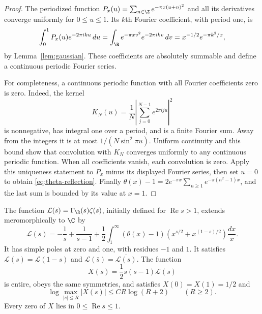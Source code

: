 \begin{proof}
The periodized function
$P_x(u)=\sum_{n\in\Z}e^{-\pi x(u+n)^2}$ and all its derivatives converge
uniformly for $0\leq u\leq1$.
Its $k$th Fourier coefficient, with period one, is
\[
 \int_0^1P_x(u)e^{-2\pi iku}\,du
 =\int_{\R}e^{-\pi xv^2}e^{-2\pi ikv}\,dv
 =x^{-1/2}e^{-\pi k^2/x},
\]
by Lemma~\ref{lem:gaussian}.
These coefficients are absolutely summable and define a continuous
periodic Fourier series.

For completeness, a continuous periodic function with all Fourier
coefficients zero is zero.  Indeed, the kernel
\[
 K_N(u)=\frac1N\left|\sum_{j=0}^{N-1}e^{2\pi iju}\right|^2
\]
is nonnegative, has integral one over a period, and is a finite Fourier sum.
Away from the integers it is at most $1/(N\sin^2\pi u)$.
Uniform continuity and this bound show that convolution with $K_N$ converges
uniformly to any continuous periodic function.
When all coefficients vanish, each convolution is zero.
Apply this uniqueness statement to $P_x$ minus its displayed Fourier series,
then set $u=0$ to obtain \eqref{eq:theta-reflection}.
Finally
$\theta(x)-1=2e^{-\pi x}\sum_{n\geq1}e^{-\pi(n^2-1)x}$,
and the last sum is bounded by its value at $x=1$.
\end{proof}

\begin{theorem}
\label{thm:completion}
The function $\mathcal L(s)=\Gamma_{\R}(s)\zeta(s)$, initially defined for
$\operatorname{Re}s>1$, extends meromorphically to $\C$ by
\begin{equation}
 \mathcal L(s)=-\frac1s+\frac1{s-1}
   +\frac12\int_1^\infty(\theta(x)-1)
                   \left(x^{s/2}+x^{(1-s)/2}\right)\frac{dx}{x}.
 \label{eq:theta-mellin}
\end{equation}
It has simple poles at zero and one, with residues $-1$ and $1$.
It satisfies $\mathcal L(s)=\mathcal L(1-s)$ and
$\mathcal L(\bar s)=\overline{\mathcal L(s)}$.
The function
\begin{equation}
 X(s)=\frac12 s(s-1)\mathcal L(s)
 \label{eq:entire-completion}
\end{equation}
is entire, obeys the same symmetries, and satisfies
$X(0)=X(1)=1/2$ and
\begin{equation}
 \log\max_{|s|\leq R}|X(s)|\leq C R\log(R+2)\qquad(R\geq2).
 \label{eq:entire-growth}
\end{equation}
Every zero of $X$ lies in $0\leq\operatorname{Re}s\leq1$.
\end{theorem}

